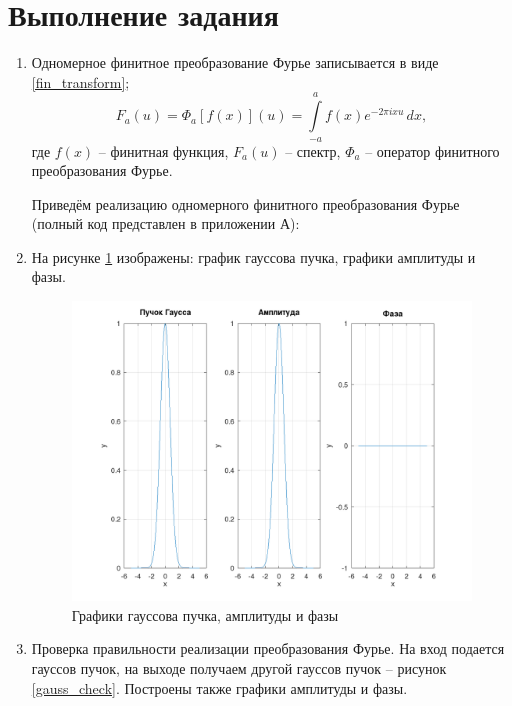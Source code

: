 \section*{Выполнение задания}
{
	\begin{enumerate}
		\item {
			Одномерное финитное преобразование Фурье записывается в виде \eqref{fin_transform};
			\begin{equation}\label{fin_transform}
			F_a(u) = \Phi_a \left[ f(x) \right] (u) = \int\limits_{-a}^{a} f(x) e^{-2 \pi i x u} \,dx,
			\end{equation}
			где $f(x)$ -- финитная функция, $F_a(u)$ -- спектр, $\Phi_a$ -- оператор финитного преобразования Фурье.
			
			Приведём реализацию одномерного финитного преобразования Фурье (полный код представлен в приложении А):
			
		}
		
		\item {
			На рисунке \ref{gauss} изображены: график гауссова пучка, графики амплитуды и фазы.
			
			\begin{figure}[H]
				\includegraphics[width=0.75\pagewidth]{gauss}
				\caption{Графики гауссова пучка, амплитуды и фазы}
				\label{gauss}
			\end{figure}
		}
		
		\item{
			Проверка правильности реализации преобразования Фурье. На вход подается гауссов пучок, на выходе получаем другой гауссов пучок -- рисунок \ref{gauss_check}. Построены также графики амплитуды и фазы.
			
}
\end{enumerate}}
